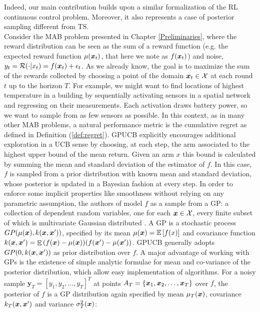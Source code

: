 Indeed, our main contribution builds upon a similar formalization of the \gls{RL} continuous control problem. Moreover, it also represents a case of posterior sampling different from \gls{TS}. \\
Consider the \gls{MAB} problem presented in Chapter \ref{Preliminaries}, where the reward distribution can be seen as the sum of a reward function (e.g. the expected reward function $\mu(\boldsymbol{x}_t)$, that here we note as $f(\boldsymbol{x}_t)$) and noise, \ie $y_t = \mathcal{R}(\cdot|x_t) = f(\boldsymbol{x}_t) + \epsilon_t$. As we already know, the goal is to maximize the sum of the rewards collected by choosing a point of the domain $\boldsymbol{x}_t\in\mathcal{X}$ at each round $t$ up to the horizon $T$. For example, we might want to find locations of highest temperature in a building by sequentially activating sensors in a spatial network and regressing on their measurements. Each activation draws battery power, so we want to sample from as few sensors as possible.  In this context, as in many other \gls{MAB} problems, a natural performance metric is the cumulative regret as defined in Definition (\ref{def:regret}). \gls{GPUCB} explicitly encourages additional exploration in a \gls{UCB} sense by choosing, at each step, the arm associated to the highest upper bound of the mean return. Given an arm $x$  this bound is calculated by summing the mean and standard deviation of the estimator of $f$. In this case, $f$ is sampled from a prior distribution with known mean and standard deviation, whose posterior is updated in a Bayesian fashion at every step.
In order to enforce some implicit properties like smoothness without relying on any parametric assumption, the authors of \cite{srinivas2010gaussian} model $f$ as a sample from a \gls{GP}: a collection of dependent random variables, one for each $\boldsymbol{x}\in\mathcal{X}$, every finite subset of which is multivariate Gaussian distributed \cite{williams2006gaussian}. A \gls{GP} is a stochastic process $GP(\mu(\boldsymbol{x}), k(\boldsymbol{x},\boldsymbol{x}'))$, specified by its mean $\mu(\boldsymbol{x}) = \mathop{\mathbb{E}\left[{f(x)}\right]}$ and covariance function $k(\boldsymbol{x},\boldsymbol{x}') = \mathop{\mathbb{E}}{(f(\boldsymbol{x})-\mu(\boldsymbol{x}))(f(\boldsymbol{x}')-\mu(\boldsymbol{x}'))}$. \gls{GPUCB} generally adopts $GP(0,k(\boldsymbol{x},\boldsymbol{x}'))$ as prior distribution over $f$.  A major advantage of working with GPs is the existence of simple analytic formulae for mean and co-variance of the posterior distribution, which allow easy implementation of algorithms. For a noisy sample $\boldsymbol{y}_T = [y_1,y_2,\dots, y_T]^T$ at points $A_T = \{\boldsymbol{x}_1,\boldsymbol{x}_2,\dots,\boldsymbol{x}_T\}$ over $f$, the posterior of $f$ is a GP distribution again specified by mean $\mu_T(\boldsymbol{x})$, covariance $k_T(\boldsymbol{x},\boldsymbol{x}')$ and variance $\sigma^2_T(\boldsymbol{x})$:

